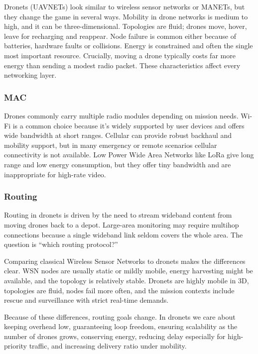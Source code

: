 Dronets (UAVNETs) look similar to wireless sensor networks or MANETs, but they change the game in several ways.
Mobility in drone networks is medium to high, and it can be three-dimensional. Topologies are fluid; drones move, hover, leave for recharging and reappear. Node failure is common either because of batteries, hardware faults or collisions. Energy is constrained and often the single most important resource. Crucially, moving a drone typically costs far more energy than sending a modest radio packet. These characteristics affect every networking layer.

\subsubsection{MAC}
Drones commonly carry multiple radio modules depending on mission needs. Wi-Fi is a common choice because it’s widely supported by user devices and offers wide bandwidth at short ranges. Cellular can provide robust backhaul and mobility support, but in many emergency or remote scenarios cellular connectivity is not available. Low Power Wide Area Networks like LoRa give long range and low energy consumption, but they offer tiny bandwidth and are inappropriate for high-rate video.

\subsubsection{Routing}
Routing in dronets is driven by the need to stream wideband content from moving drones back to a depot. Large-area monitoring may require multihop connections because a single wideband link seldom covers the whole area. The question is “which routing protocol?”

Comparing classical Wireless Sensor Networks to dronets makes the differences clear. WSN nodes are usually static or mildly mobile, energy harvesting might be available, and the topology is relatively stable. Dronets are highly mobile in 3D, topologies are fluid, nodes fail more often, and the mission contexts include rescue and surveillance with strict real-time demands.

Because of these differences, routing goals change. In dronets we care about keeping overhead low, guaranteeing loop freedom, ensuring scalability as the number of drones grows, conserving energy, reducing delay especially for high-priority traffic, and increasing delivery ratio under mobility.

